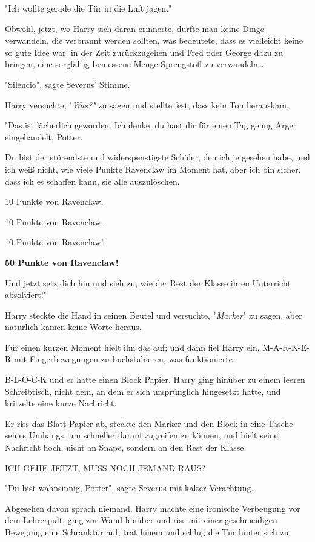 {"Ich wollte gerade die Tür in die Luft jagen."

Obwohl, jetzt, wo Harry sich daran erinnerte, durfte man keine Dinge verwandeln, die verbrannt werden sollten, was bedeutete, dass es vielleicht keine so gute Idee war, in der Zeit zurückzugehen und Fred oder George dazu zu bringen, eine sorgfältig bemessene Menge Sprengstoff zu verwandeln…

"Silencio", sagte Severus' Stimme.

Harry versuchte, "\emph{Was?"} zu sagen und stellte fest, dass kein Ton herauskam.

"Das ist lächerlich geworden. Ich denke, du hast dir für einen Tag genug Ärger eingehandelt, Potter.

Du bist der störendste und widerspenstigste Schüler, den ich je gesehen habe, und ich weiß nicht, wie viele Punkte Ravenclaw im Moment hat, aber ich bin sicher, dass ich es schaffen kann, sie alle auszulöschen.

10 Punkte von Ravenclaw.

10 Punkte von Ravenclaw.

10 Punkte von Ravenclaw!

\textbf{50 Punkte von Ravenclaw!}

Und jetzt setz dich hin und sieh zu, wie der Rest der Klasse ihren Unterricht absolviert!"

Harry steckte die Hand in seinen Beutel und versuchte, "\emph{Marker}" zu sagen, aber natürlich kamen keine Worte heraus.

Für einen kurzen Moment hielt ihn das auf; und dann fiel Harry ein, M-A-R-K-E-R mit Fingerbewegungen zu buchstabieren, was funktionierte.

B-L-O-C-K und er hatte einen Block Papier. Harry ging hinüber zu einem leeren Schreibtisch, nicht dem, an dem er sich ursprünglich hingesetzt hatte, und kritzelte eine kurze Nachricht.

Er riss das Blatt Papier ab, steckte den Marker und den Block in eine Tasche seines Umhangs, um schneller darauf zugreifen zu können, und hielt seine Nachricht hoch, nicht an Snape, sondern an den Rest der Klasse.

ICH GEHE JETZT, MUSS NOCH JEMAND RAUS?

"Du bist wahnsinnig, Potter", sagte Severus mit kalter Verachtung.

Abgesehen davon sprach niemand. Harry machte eine ironische Verbeugung vor dem Lehrerpult, ging zur Wand hinüber und riss mit einer geschmeidigen Bewegung eine Schranktür auf, trat hinein und schlug die Tür hinter sich zu.

}
